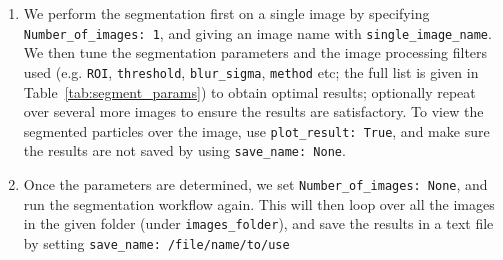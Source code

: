 \documentclass[10pt,a4paper]{article}
\begin{document}
\begin{enumerate}
	\item We perform the segmentation first on a single image by specifying \texttt{Number\_of\_images: 1}, and giving an image name with \texttt{single\_image\_name}. We then tune the segmentation parameters and the image processing filters used (e.g. \texttt{ROI}, \texttt{threshold}, \texttt{blur\_sigma}, \texttt{method} etc; the full list is given in Table~\ref{tab:segment_params}) to obtain optimal results; optionally repeat over several more images to ensure the results are satisfactory. To view the segmented particles over the image, use \texttt{plot\_result: True}, and make sure the results are not saved by using \texttt{save\_name: None}. 
	
	\item Once the parameters are determined, we set \texttt{Number\_of\_images: None}, and run the segmentation workflow again. This will then loop over all the images in the given folder (under \texttt{images\_folder}), and save the results in a text file by setting \texttt{save\_name: /file/name/to/use}
\end{enumerate}


\vspace{.5cm}
\end{document}
